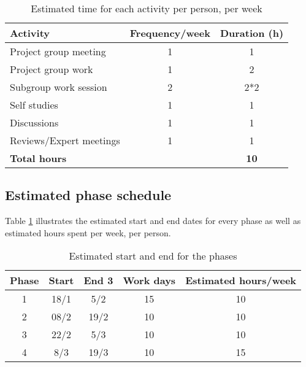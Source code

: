 \documentclass{article}
\begin{document}
        \begin{table}[h]
            \centering
            \begin{tabular}{|l|c|c|}
                \hline
                    \textbf{Activity} & \textbf{Frequency/week} & \textbf{Duration (h)} \\
                \hline
                    Project group meeting & 1 & 1 \\
                 \hline
                    Project group work & 1 & 2 \\
                 \hline
                    Subgroup work session & 2 & 2*2 \\
                 \hline
                    Self studies & 1  & 1 \\
                 \hline
                    Discussions & 1 & 1 \\
                 \hline
                    Reviews/Expert meetings & 1 & 1 \\
                 \hline
                    \textbf{Total hours} & & \textbf{10} \\
                 \hline
            \end{tabular}
            \caption{Estimated time for each activity per person, per week}
        \end{table}
    
    \subsection{Estimated phase schedule}
        Table \ref{phasetable} illustrates the estimated start and end dates 
        for every phase as well as estimated hours spent per week, per person.

        \begin{table}[h]
            \centering
            \begin{tabular}{|c|c|c|c|c|}
                \hline
                    \textbf{Phase} & \textbf{Start} & \textbf{End} 3 & \textbf{Work days} & 
                    \textbf{Estimated hours/week} \\
                \hline
                    1 & 18/1 & 5/2 & 15 & 10 \\
                 \hline
                    2 & 08/2 & 19/2 & 10 & 10 \\
                 \hline
                    3 & 22/2 & 5/3  & 10 & 10 \\
                 \hline
                    4 & 8/3 & 19/3  & 10 & 15 \\
                 \hline
            \end{tabular}
            \caption{Estimated start and end for the phases}
            \label{phasetable}
        \end{table}
        
\end{document}
